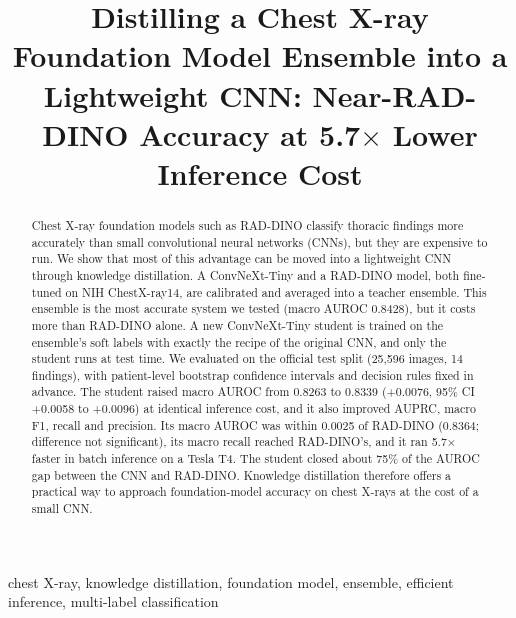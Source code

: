 \documentclass[conference]{IEEEtran}
\newcommand{\authornote}[1]{\textbf{\textcolor{blue}{[#1]}}}
\begin{document}
\title{Distilling a Chest X-ray Foundation Model Ensemble into a Lightweight CNN: Near-RAD-DINO Accuracy at 5.7$\times$ Lower Inference Cost}

\author{
\IEEEauthorblockN{\authornote{Author 1}, \authornote{Author 2}}
\IEEEauthorblockA{\authornote{Department, University}\\
\authornote{City, Country}\\
\authornote{email}}
}

\maketitle

\begin{abstract}
Chest X-ray foundation models such as RAD-DINO classify thoracic findings more accurately than small convolutional neural networks (CNNs), but they are expensive to run. We show that most of this advantage can be moved into a lightweight CNN through knowledge distillation. A ConvNeXt-Tiny and a RAD-DINO model, both fine-tuned on NIH ChestX-ray14, are calibrated and averaged into a teacher ensemble. This ensemble is the most accurate system we tested (macro AUROC 0.8428), but it costs more than RAD-DINO alone. A new ConvNeXt-Tiny student is trained on the ensemble's soft labels with exactly the recipe of the original CNN, and only the student runs at test time. We evaluated on the official test split (25,596 images, 14 findings), with patient-level bootstrap confidence intervals and decision rules fixed in advance. The student raised macro AUROC from 0.8263 to 0.8339 (+0.0076, 95\% CI +0.0058 to +0.0096) at identical inference cost, and it also improved AUPRC, macro F1, recall and precision. Its macro AUROC was within 0.0025 of RAD-DINO (0.8364; difference not significant), its macro recall reached RAD-DINO's, and it ran 5.7$\times$ faster in batch inference on a Tesla T4. The student closed about 75\% of the AUROC gap between the CNN and RAD-DINO. Knowledge distillation therefore offers a practical way to approach foundation-model accuracy on chest X-rays at the cost of a small CNN.
\end{abstract}

\begin{IEEEkeywords}
chest X-ray, knowledge distillation, foundation model, ensemble, efficient inference, multi-label classification
\end{IEEEkeywords}
\end{document}
